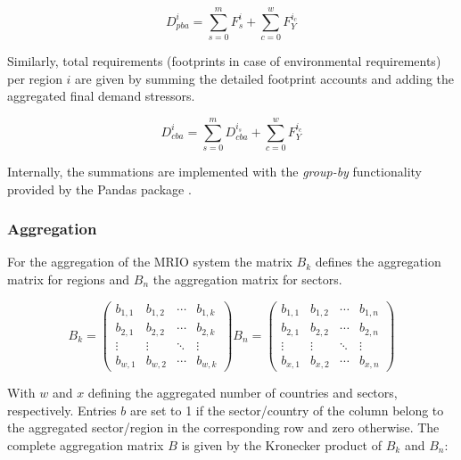 \documentclass{jors}
\begin{document}
{\begin{equation}
    D_{pba}^i = \sum_{s=0}^m F^i_s + \sum_{c=0}^w F_Y^{i_c}
\end{equation}

Similarly, total requirements (footprints in case of environmental requirements) per region $i$ are given by summing the detailed footprint accounts and adding the aggregated final demand stressors.

\begin{equation}
    D_{cba}^i = \sum_{s=0}^m D_{cba}^{i_s} + \sum_{c=0}^w F_Y^{i_c}
\end{equation}

Internally, the summations are implemented with the \textit{group-by} functionality provided by the Pandas package \cite{mckinney2010_Data}.


\subsubsection*{Aggregation}

For the aggregation of the MRIO system the matrix $B_k$ defines
the aggregation matrix for regions and $B_n$ the aggregation matrix
for sectors.

\begin{equation}
    B_k =
    \begin{pmatrix}
      b_{1,1} & b_{1,2} & \cdots & b_{1,k} \\
      b_{2,1} & b_{2,2} & \cdots & b_{2,k} \\
      \vdots  & \vdots  & \ddots & \vdots  \\
      b_{w,1} & b_{w,2} & \cdots & b_{w,k}
    \end{pmatrix}
    B_n =
    \begin{pmatrix}
      b_{1,1} & b_{1,2} & \cdots & b_{1,n} \\
      b_{2,1} & b_{2,2} & \cdots & b_{2,n} \\
      \vdots  & \vdots  & \ddots & \vdots  \\
      b_{x,1} & b_{x,2} & \cdots & b_{x,n}
    \end{pmatrix}
\end{equation}

With $w$ and $x$ defining the aggregated number of countries and sectors,
respectively. Entries $b$ are set to 1 if the sector/country of the column
belong to the aggregated sector/region in the corresponding row and zero
otherwise. The complete aggregation matrix $B$ is given by the Kronecker
product of $B_k$ and $B_n$:

}
\end{document}
